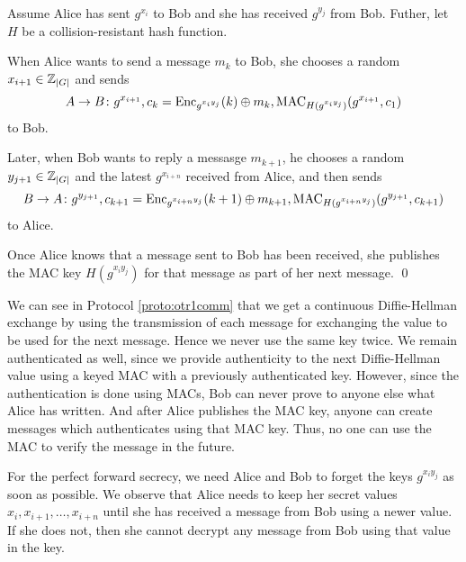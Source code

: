 \begin{protocol}\label{proto:otr1comm}
  Assume Alice has sent \(g^{x_i}\) to Bob and she has received \(g^{y_j}\) 
  from Bob.
  Futher, let \(H\) be a collision-resistant hash function.

  When Alice wants to send a message \(m_k\) to Bob, she chooses a random 
  \(x_{i+1}\in\operatorname{\mathbb Z}_{|G|}\) and sends
  \begin{equation*}
    A\to B\colon g^{x_{i+1}},
      c_k = \operatorname{\mathrm{Enc}}_{g^{x_i y_j}}( k )\oplus m_k,
      \operatorname{\mathrm{MAC}}_{H( g^{x_i y_j} )}( g^{x_{i+1}}, c_1 )
  \end{equation*}
  to Bob.

  Later, when Bob wants to reply a messasge \(m_{k+1}\), he chooses a random 
  \(y_{j+1}\in\operatorname{\mathbb Z}_{|G|}\) and the latest \(g^{x_{i+n}}\) received from Alice, 
  and then sends
  \begin{equation*}
    B\to A\colon g^{y_{j+1}},
    c_{k+1} = \operatorname{\mathrm{Enc}}_{g^{x_{i+n} y_j}}( k+1 )\oplus m_{k+1},
    \operatorname{\mathrm{MAC}}_{H( g^{x_{i+n} y_j} )}( g^{y_{j+1}}, c_{k+1} )
  \end{equation*}
  to Alice.

  Once Alice knows that a message sent to Bob has been received, she publishes 
  the \ac{MAC} key \( H( g^{x_i y_j} ) \) for that message as part of her next 
  message.
  \qed
\end{protocol}

We can see in Protocol \ref{proto:otr1comm} that we get a continuous 
Diffie-Hellman exchange by using the transmission of each message for 
exchanging the value to be used for the next message.
Hence we never use the same key twice.
We remain authenticated as well, since we provide authenticity to the next 
Diffie-Hellman value using a keyed \ac{MAC} with a previously authenticated 
key.
However, since the authentication is done using \acp{MAC}, Bob can never prove 
to anyone else what Alice has written.
And after Alice publishes the \ac{MAC} key, anyone can create messages which 
authenticates using that \ac{MAC} key.
Thus, no one can use the \ac{MAC} to verify the message in the future.

For the perfect forward secrecy, we need Alice and Bob to forget the keys 
\(g^{x_i y_j}\) as soon as possible.
We observe that Alice needs to keep her secret values \(x_i, x_{i+1}, \ldots, 
x_{i+n}\) until she has received a message from Bob using a newer value.
If she does not, then she cannot decrypt any message from Bob using that value 
in the key.

